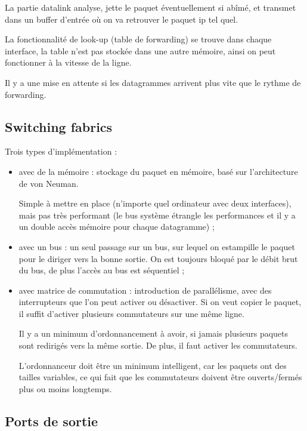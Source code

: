 	
	La partie datalink analyse, jette le paquet éventuellement si abîmé, et transmet dans un buffer d'entrée où on va retrouver le paquet ip tel quel.
	
	La fonctionnalité de look-up (table de forwarding) se trouve dans chaque interface, la table n'est pas stockée dans une autre mémoire, ainsi on peut fonctionner à la vitesse de la ligne.
	
	Il y a une mise en attente si les datagrammes arrivent plus vite que le rythme de forwarding.
	
	\subsection{Switching fabrics}
	
	Trois types d'implémentation :
	
	\begin{itemize}
		\item avec de la mémoire : stockage du paquet en mémoire, basé sur l'architecture de von Neuman. 
		
		Simple à mettre en place (n'importe quel ordinateur avec deux interfaces), mais pas très performant (le bus système étrangle les performances et il y a un double accès mémoire pour chaque datagramme) ;
		
		
		\item avec un bus : un seul passage sur un bus, sur lequel on estampille le paquet pour le diriger vers la bonne sortie. On est toujours bloqué par le débit brut du bus, de plus l'accès au bus est séquentiel ;
		\item avec matrice de commutation : introduction de parallélisme, avec des interrupteurs que l'on peut activer ou désactiver. Si on veut copier le paquet, il suffit d'activer plusieurs commutateurs sur une même ligne. 
		
		Il y a un minimum d'ordonnancement à avoir, si jamais plusieurs paquets sont redirigés vers la même sortie. De plus, il faut activer les commutateurs.
		
		L'ordonnanceur doit être un minimum intelligent, car les paquets ont des tailles variables, ce qui fait que les commutateurs doivent être ouverts/fermés plus ou moins longtemps.
	\end{itemize}
	
	
	
	\subsection{Ports de sortie}
	
